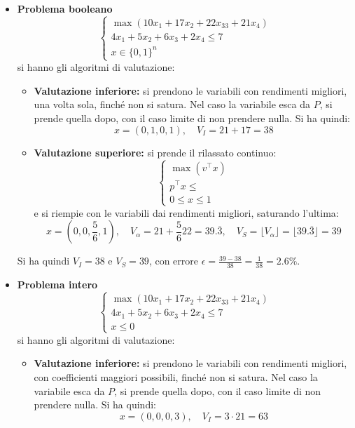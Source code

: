 \documentclass[a4paper,11pt]{article}
\begin{document}
\begin{itemize}
	\item \textbf{\textsf{Problema booleano}} \\
	\[
		\begin{cases}
			\max(10 x_1 + 17 x_2 + 22 x_33 + 21 x_4) \\ 
			4 x_1 + 5 x_2 + 6 x_3 + 2 x_4 \leq 7 \\ 
			x \in \{ 0, 1 \}^n
		\end{cases}
	\]
	si hanno gli algoritmi di valutazione:
	\begin{itemize}
		\item \textbf{Valutazione inferiore:} si prendono le variabili con rendimenti migliori, una volta sola, finché non si satura.
			Nel caso la variabile esca da $P$, si prende quella dopo, con il caso limite di non prendere nulla.
			Si ha quindi:
			$$ x = (0, 1, 0, 1), \quad V_I = 21 + 17 = 38 $$
		\item \textbf{Valutazione superiore:} si prende il rilassato continuo:
			\[
				\begin{cases}
					\max (v^\intercal x) \\ 
					p^\intercal x \leq \\ 
					0 \leq x \leq 1
				\end{cases}
			\]
			e si riempie con le variabili dai rendimenti migliori, saturando l'ultima:
			$$ x = \left( 0, 0, \frac{5}{6}, 1 \right), \quad V_\alpha = 21 + \frac{5}{6} 22 = 39.\overline{3}, \quad V_S = \lfloor V_\alpha \rfloor = \lfloor 39.\overline{3} \rfloor = 39 $$
	\end{itemize}
	Si ha quindi $V_I = 38$ e $V_S = 39$, con errore $\epsilon = \frac{39 - 38}{38} = \frac{1}{38} = 2.6\%$.
\item \textbf{\textsf{Problema intero}} \\
	\[
		\begin{cases}
			\max(10 x_1 + 17 x_2 + 22 x_33 + 21 x_4) \\ 
			4 x_1 + 5 x_2 + 6 x_3 + 2 x_4 \leq 7 \\ 
			x \leq 0
		\end{cases}
	\]
	si hanno gli algoritmi di valutazione:
	\begin{itemize}
		\item \textbf{Valutazione inferiore:} si prendono le variabili con rendimenti migliori, con coefficienti maggiori possibili, finché non si satura.
			Nel caso la variabile esca da $P$, si prende quella dopo, con il caso limite di non prendere nulla.
			Si ha quindi:
			$$ x = (0, 0, 0, 3), \quad V_I = 3 \cdot 21 = 63 $$

\end{itemize}
\end{itemize}
\end{document}

